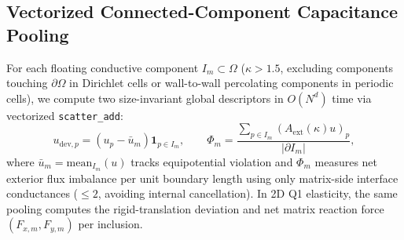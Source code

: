 \documentclass[preprint,11pt]{elsarticle}
\newcommand{\abs}[1]{\left\lvert #1 \right\rvert}
\begin{document}
\subsection{Vectorized Connected-Component Capacitance Pooling}
For each floating conductive component $I_m \subset \Omega$ ($\kappa > 1.5$, excluding components touching $\partial\Omega$ in Dirichlet cells or wall-to-wall percolating components in periodic cells), we compute two size-invariant global descriptors in $O(N^d)$ time via vectorized \texttt{scatter\_add}:
\begin{equation}\label{eq:cap_pool}
  u_{\mathrm{dev}, p} = (u_p - \bar u_m)\mathbf{1}_{p \in I_m},
  \qquad
  \Phi_m = \frac{\sum_{p \in I_m} (A_{\mathrm{ext}}(\kappa) u)_p}{\abs{\partial I_m}},
\end{equation}
where $\bar u_m = \mathrm{mean}_{I_m}(u)$ tracks equipotential violation and $\Phi_m$ measures net exterior flux imbalance per unit boundary length using only matrix-side interface conductances ($\le 2$, avoiding internal cancellation). In 2D Q1 elasticity, the same pooling computes the rigid-translation deviation and net matrix reaction force $(F_{x,m}, F_{y,m})$ per inclusion.
\end{document}
